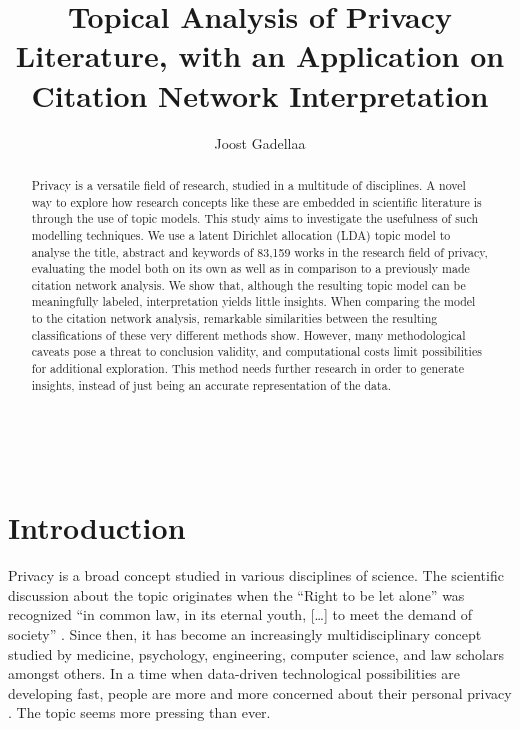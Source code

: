 \documentclass[runningheads]{llncs}
\begin{document}
%
\title{Topical Analysis of Privacy Literature, with an Application on Citation Network Interpretation} %
%
%
\author{Joost Gadellaa}
%
%
\\
%
\maketitle              %
%
\begin{abstract}
Privacy is a versatile field of research, studied in a multitude of disciplines. A novel way to explore how research concepts like these are embedded in scientific literature is through the use of topic models. This study aims to investigate the usefulness of such modelling techniques. We use a latent Dirichlet allocation (LDA) topic model to analyse the title, abstract and keywords of 83,159 works in the research field of privacy, evaluating the model both on its own as well as in comparison to a previously made citation network analysis. We show that, although the resulting topic model can be meaningfully labeled, interpretation yields little insights. When comparing the model to the citation network analysis, remarkable similarities between the resulting classifications of these very different methods show. However, many methodological caveats pose a threat to conclusion validity, and computational costs limit possibilities for additional exploration. This method needs further research in order to generate insights, instead of just being an accurate representation of the data. 
\end{abstract}
%
%
%
\section{Introduction}
Privacy is a broad concept studied in various disciplines of science. The scientific discussion about the topic originates when the “Right to be let alone” was recognized “in common law, in its eternal youth, […] to meet the demand of society” \cite{warren_right_1890}. Since then, it has become an increasingly multidisciplinary concept studied by medicine, psychology, engineering, computer science, and law scholars amongst others. In a time when data-driven technological possibilities are developing fast, people are more and more concerned about their personal privacy \cite{kokolakis_privacy_2017}. The topic seems more pressing than ever. 
\end{document}
